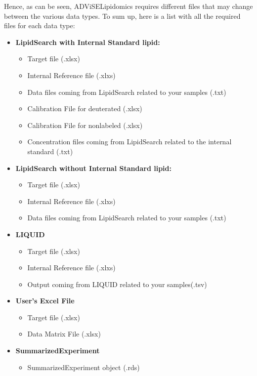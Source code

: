 \documentclass[
]{book}
\providecommand{\tightlist}{%
  \setlength{\itemsep}{0pt}\setlength{\parskip}{0pt}}
\begin{document}
Hence, as can be seen, ADViSELipidomics requires different files that may change between the various data types. To sum up, here is a list with all the required files for each data type:

\begin{itemize}
\tightlist
\item
  \textbf{LipidSearch with Internal Standard lipid:}

  \begin{itemize}
  \tightlist
  \item
    Target file (.xlsx)
  \item
    Internal Reference file (.xlxs)
  \item
    Data files coming from LipidSearch related to your samples (.txt)
  \item
    Calibration File for deuterated (.xlsx)
  \item
    Calibration File for nonlabeled (.xlsx)
  \item
    Concentration files coming from LipidSearch related to the internal standard (.txt)
  \end{itemize}
\item
  \textbf{LipidSearch without Internal Standard lipid:}

  \begin{itemize}
  \tightlist
  \item
    Target file (.xlsx)
  \item
    Internal Reference file (.xlxs)
  \item
    Data files coming from LipidSearch related to your samples (.txt)
  \end{itemize}
\item
  \textbf{LIQUID}

  \begin{itemize}
  \tightlist
  \item
    Target file (.xlsx)
  \item
    Internal Reference file (.xlxs)
  \item
    Output coming from LIQUID related to your samples(.tsv)
  \end{itemize}
\item
  \textbf{User's Excel File}

  \begin{itemize}
  \tightlist
  \item
    Target file (.xlsx)
  \item
    Data Matrix File (.xlsx)
  \end{itemize}
\item
  \textbf{SummarizedExperiment}

  \begin{itemize}
  \tightlist
  \item
    SummarizedExperiment object (.rds)
  \end{itemize}
\end{itemize}
\end{document}
